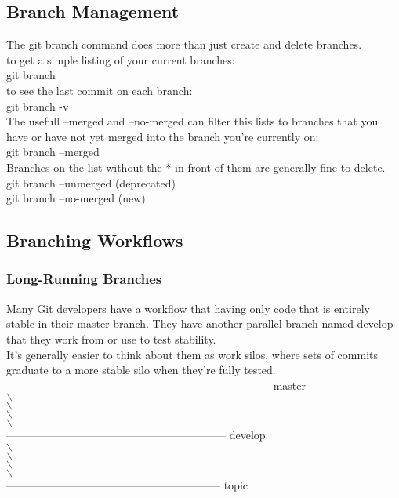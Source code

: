 \documentclass[11pt]{article}
\begin{document}
\subsection{Branch Management}
\label{sec:orge9a8306}
The git branch command does more than just create and delete branches.\\

to get a simple listing of your current branches:\\
git branch\\


to see the last commit on each branch:\\
git branch -v\\

The usefull --merged and --no-merged can filter this lists to branches that you have or have not yet merged into the branch you're currently on:\\
git branch --merged\\

Branches on the list without the * in front of them are generally fine to delete.\\

git branch --unmerged (deprecated)\\
git branch --no-merged (new)\\


\subsection{Branching Workflows}
\label{sec:org0d16962}

\subsubsection{Long-Running Branches}
\label{sec:org48514bf}
Many Git developers have a workflow that having only code that is entirely stable in their master branch. They have another parallel branch named develop that they work from or use to test stability.\\

It's generally easier to think about them as work silos, where sets of commits graduate to a more stable silo when they're fully tested.\\



------------------------------------------------------------------------     master\\
	 $\backslash$\\
	  $\backslash$\\
	   $\backslash$\\
	    $\backslash$\\
	     ------------------------------------------------------------    develop\\
	      $\backslash$\\
	       $\backslash$\\
       	       	$\backslash$\\
		 $\backslash$\\
		  -----------------------------------------------------------  topic\\
\end{document}
